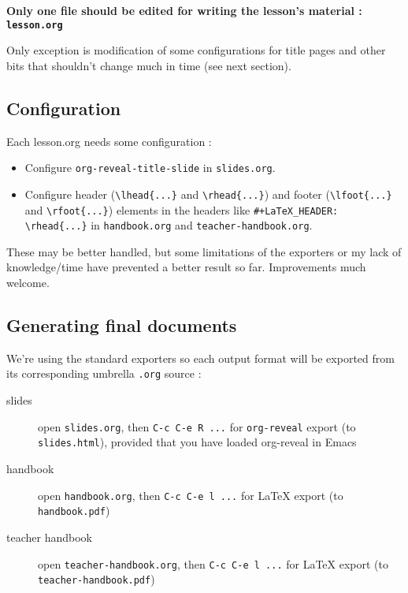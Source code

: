 \documentclass[a4paper]{article}
\begin{document}
\textbf{Only one file should be edited for writing the lesson's material : \texttt{lesson.org}}

Only exception is modification of some configurations for title pages
and other bits that shouldn't change much in time (see next section).

\subsection{Configuration}
\label{sec:org61dbc8b}

Each lesson.org needs some configuration :
\begin{itemize}
\item Configure \texttt{org-reveal-title-slide} in \texttt{slides.org}.

\item Configure header (\texttt{\textbackslash{}lhead\{...\}} and \texttt{\textbackslash{}rhead\{...\}}) and footer
(\texttt{\textbackslash{}lfoot\{...\}} and \texttt{\textbackslash{}rfoot\{...\}}) elements in the headers like
\texttt{\#+LaTeX\_HEADER: \textbackslash{}rhead\{...\}} in \texttt{handbook.org} and
\texttt{teacher-handbook.org}.
\end{itemize}

\begin{NOTES}
These may be better handled, but some limitations of the exporters or
my lack of knowledge/time have prevented a better result so
far. Improvements much welcome.
\end{NOTES}

\subsection{Generating final documents}
\label{sec:org7701118}

We're using the standard exporters so each output format will be exported from its corresponding umbrella \texttt{.org} source :

\begin{description}
\item[{slides}] open \texttt{slides.org}, then \texttt{C-c C-e R ...} for \texttt{org-reveal} export (to \texttt{slides.html}), provided that you have loaded org-reveal in Emacs
\item[{handbook}] open \texttt{handbook.org}, then \texttt{C-c C-e l ...} for \LaTeX{} export (to \texttt{handbook.pdf})
\item[{teacher handbook}] open \texttt{teacher-handbook.org}, then \texttt{C-c C-e l ...} for \LaTeX{} export (to \texttt{teacher-handbook.pdf})
\end{description}
\end{document}
